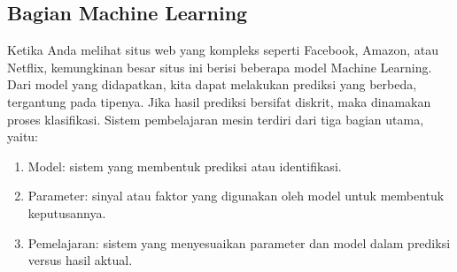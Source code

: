 \subsection {Bagian Machine Learning}
Ketika Anda melihat situs web yang kompleks seperti Facebook, Amazon, atau Netflix, kemungkinan besar situs ini berisi beberapa model Machine Learning. Dari model yang didapatkan, kita dapat melakukan prediksi yang berbeda, tergantung pada tipenya. Jika hasil prediksi bersifat diskrit, maka dinamakan proses klasifikasi. Sistem pembelajaran mesin terdiri dari tiga bagian utama, yaitu:
\begin{enumerate}
\item Model: sistem yang membentuk prediksi atau identifikasi.
\item Parameter: sinyal atau faktor yang digunakan oleh model untuk membentuk keputusannya.
\item Pemelajaran: sistem yang menyesuaikan parameter dan model dalam prediksi versus hasil aktual.
\end{enumerate}
